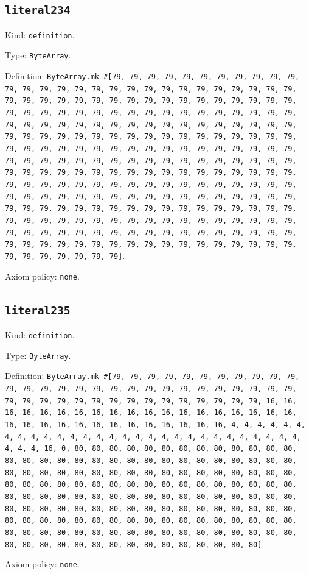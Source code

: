 \documentclass[11pt]{article}
\begin{document}
\subsection*{\texttt{literal234}}
\noindent Kind: \texttt{definition}.\par
\noindent Type: \texttt{ByteArray}.\par
\noindent Definition: \texttt{ByteArray.mk \#[79, 79, 79, 79, 79, 79, 79, 79, 79, 79, 79, 79, 79, 79, 79, 79, 79, 79, 79, 79, 79, 79, 79, 79, 79, 79, 79, 79, 79, 79, 79, 79, 79, 79, 79, 79, 79, 79, 79, 79, 79, 79, 79, 79, 79, 79, 79, 79, 79, 79, 79, 79, 79, 79, 79, 79, 79, 79, 79, 79, 79, 79, 79, 79, 79, 79, 79, 79, 79, 79, 79, 79, 79, 79, 79, 79, 79, 79, 79, 79, 79, 79, 79, 79, 79, 79, 79, 79, 79, 79, 79, 79, 79, 79, 79, 79, 79, 79, 79, 79, 79, 79, 79, 79, 79, 79, 79, 79, 79, 79, 79, 79, 79, 79, 79, 79, 79, 79, 79, 79, 79, 79, 79, 79, 79, 79, 79, 79, 79, 79, 79, 79, 79, 79, 79, 79, 79, 79, 79, 79, 79, 79, 79, 79, 79, 79, 79, 79, 79, 79, 79, 79, 79, 79, 79, 79, 79, 79, 79, 79, 79, 79, 79, 79, 79, 79, 79, 79, 79, 79, 79, 79, 79, 79, 79, 79, 79, 79, 79, 79, 79, 79, 79, 79, 79, 79, 79, 79, 79, 79, 79, 79, 79, 79, 79, 79, 79, 79, 79, 79, 79, 79, 79, 79, 79, 79, 79, 79, 79, 79, 79, 79, 79, 79, 79, 79, 79, 79, 79, 79, 79, 79, 79, 79, 79, 79, 79, 79, 79, 79, 79, 79, 79, 79, 79, 79, 79, 79, 79, 79, 79, 79, 79, 79, 79, 79, 79, 79, 79, 79, 79, 79, 79, 79, 79, 79]}.\par
\noindent Axiom policy: \texttt{none}.\par
\subsection*{\texttt{literal235}}
\noindent Kind: \texttt{definition}.\par
\noindent Type: \texttt{ByteArray}.\par
\noindent Definition: \texttt{ByteArray.mk \#[79, 79, 79, 79, 79, 79, 79, 79, 79, 79, 79, 79, 79, 79, 79, 79, 79, 79, 79, 79, 79, 79, 79, 79, 79, 79, 79, 79, 79, 79, 79, 79, 79, 79, 79, 79, 79, 79, 79, 79, 79, 79, 79, 16, 16, 16, 16, 16, 16, 16, 16, 16, 16, 16, 16, 16, 16, 16, 16, 16, 16, 16, 16, 16, 16, 16, 16, 16, 16, 16, 16, 16, 16, 16, 16, 4, 4, 4, 4, 4, 4, 4, 4, 4, 4, 4, 4, 4, 4, 4, 4, 4, 4, 4, 4, 4, 4, 4, 4, 4, 4, 4, 4, 4, 4, 4, 4, 16, 0, 80, 80, 80, 80, 80, 80, 80, 80, 80, 80, 80, 80, 80, 80, 80, 80, 80, 80, 80, 80, 80, 80, 80, 80, 80, 80, 80, 80, 80, 80, 80, 80, 80, 80, 80, 80, 80, 80, 80, 80, 80, 80, 80, 80, 80, 80, 80, 80, 80, 80, 80, 80, 80, 80, 80, 80, 80, 80, 80, 80, 80, 80, 80, 80, 80, 80, 80, 80, 80, 80, 80, 80, 80, 80, 80, 80, 80, 80, 80, 80, 80, 80, 80, 80, 80, 80, 80, 80, 80, 80, 80, 80, 80, 80, 80, 80, 80, 80, 80, 80, 80, 80, 80, 80, 80, 80, 80, 80, 80, 80, 80, 80, 80, 80, 80, 80, 80, 80, 80, 80, 80, 80, 80, 80, 80, 80, 80, 80, 80, 80, 80, 80, 80, 80, 80, 80, 80, 80, 80, 80, 80, 80, 80, 80, 80, 80, 80]}.\par
\noindent Axiom policy: \texttt{none}.\par
\end{document}
